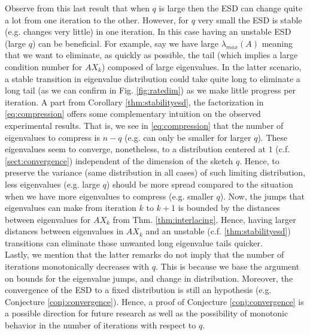 \documentclass[12pt,conference,compsocconf]{IEEEtran}
\begin{document}
Observe from this last result that when $q$ is large then the ESD can change quite a lot from one iteration to the other. However, for $q$ very small the ESD is stable (e.g. changes very little) in one iteration. In this case having an unstable ESD (large $q$) can be beneficial. For example, say we have large $\lambda_{max}(A)$ meaning that we want to eliminate, as quickly as possible, the tail (which implies a large condition number for $AX_k$) composed of large eigenvalues. In the latter scenario, a stable transition in eigenvalue distribution could take quite long to eliminate a long tail (as we can confirm in Fig. \ref{fig:ratedim}) as we make little progress per iteration. A part from Corollary \ref{thm:stabilityesd}, the factorization in \eqref{eq:compression} offers some complementary intuition on the observed experimental results. That is, we see in \eqref{eq:compression} that the number of eigenvalues to compress is $n-q$ (e.g. can only be smaller for larger $q$). These eigenvalues seem to converge, nonetheless, to a distribution centered at $1$ (c.f. \ref{sect:convergence}) independent of the dimension of the sketch $q$. Hence, to preserve the variance (same distribution in all cases) of such limiting distribution, less eigenvalues (e.g. large $q$) should be more spread compared to the situation when we have more eigenvalues to compress (e.g. smaller $q$). Now, the jumps that eigenvalues can make from iteration $k$ to $k+1$ is bounded by the distances between eigenvalues for $AX_k$ from Thm. \ref{thm:interlacing}. Hence, having larger distances between eigenvalues in $AX_k$ and an unstable (c.f. \ref{thm:stabilityesd}) transitions can eliminate those unwanted long eigenvalue tails quicker.\\
Lastly, we mention that the latter remarks do not imply that the number of iterations monotonically decreases with $q$. This is because we base the argument on bounds for the eigenvalue jumps, and change in distribution. Moreover, the convergence of the ESD to a fixed distribution is still an hypothesis (e.g. Conjecture \ref{conj:convergence}). Hence, a proof of Conjecture \ref{conj:convergence} is a possible direction for future research as well as the possibility of monotonic behavior in the number of iterations with respect to $q$.
\end{document}
